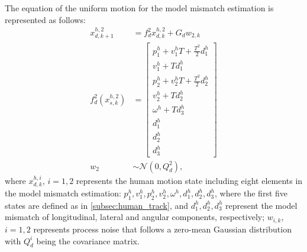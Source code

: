 \documentclass[journal]{IEEEtran}
\begin{document}
	The equation of the uniform motion for the model mismatch estimation is represented as follows:
	\begin{subequations}
		\begin{align*}
			x_{d,k+1}^{h,2}&= f_d^2x_{d,k}^{h,2}+G_dw_{2,k} \label{eqn:h_d_dyn}\\
            f_d^2(x_{s,k}^{h,2})&=\left[
			\begin{array}{c}
				p^h_1+v^h_1T+\frac{T^2}{2}d^h_1\\
				v^h_1+Td^h_1\\
				p^h_2+v^h_2T+\frac{T^2}{2}d^h_2\\
				v^h_2+Td^h_2\\
				\omega^h+Td^h_3\\ 
                d^h_1\\
                d^h_2\\
                d^h_3
			\end{array}\right] \\             
			w_2&\sim\mathcal{N}(0,Q^2_d),
		\end{align*}
	\end{subequations}\normalsize
	where $x_{d,k}^{h,i}$, $i=1,2$ represents the human motion state including eight elements in the model mismatch estimation: $p^h_1,v^h_1,p^h_2,v^h_2,\omega^h,d^h_1,d^h_2,d^h_3$, where 
the first five states are defined as in \cref{subsec:human_track}, and $d^h_1,d^h_2,d^h_3$ represent the model mismatch of longitudinal, lateral and angular components, respectively; $w_{i,k}$, $i=1,2$ represents process noise that follows a zero-mean Gaussian distribution with $Q^i_d$ being the covariance matrix.
    
\end{document}
